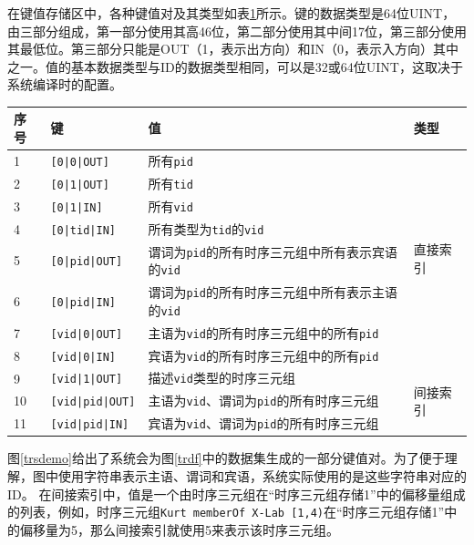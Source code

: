 在键值存储区中，各种键值对及其类型如表\ref{tab:trdf}所示。键的数据类型是64位UINT，由三部分组成，第一部分使用其高46位，第二部分使用其中间17位，第三部分使用其最低位。第三部分只能是OUT（1，表示出方向）和IN（0，表示入方向）其中之一。值的基本数据类型与ID的数据类型相同，可以是32或64位UINT，这取决于系统编译时的配置。
\begin{table}[!hpt]
  \label{tab:trdf}
  \centering
  \begin{tabular}{p{1cm}p{3cm}p{8cm}p{2cm}} \toprule
    序号 & 键 & 值 & 类型 \\ \midrule
    1\centering & \texttt{[0|0|OUT]} & 所有\texttt{pid} & \multirow{8}{*}{直接索引} \\
    2\centering & \texttt{[0|1|OUT]} & 所有\texttt{tid} & \\
    3\centering & \texttt{[0|1|IN]} & 所有\texttt{vid} & \\
    4\centering & \texttt{[0|tid|IN]} & 所有类型为\texttt{tid}的\texttt{vid} & \\
    5\centering & \texttt{[0|pid|OUT]} & 谓词为\texttt{pid}的所有时序三元组中所有表示宾语的\texttt{vid} & \\
    6\centering & \texttt{[0|pid|IN]} & 谓词为\texttt{pid}的所有时序三元组中所有表示主语的\texttt{vid} & \\
    7\centering & \texttt{[vid|0|OUT]} & 主语为\texttt{vid}的所有时序三元组中的所有\texttt{pid} & \\
    8\centering & \texttt{[vid|0|IN]} & 宾语为\texttt{vid}的所有时序三元组中的所有\texttt{pid} & \\ 
    \hline
    9\centering & \texttt{[vid|1|OUT]} & 描述\texttt{vid}类型的时序三元组 & \multirow{3}{*}{间接索引} \\ 
    10\centering & \texttt{[vid|pid|OUT]} & 主语为\texttt{vid}、谓词为\texttt{pid}的所有时序三元组 & \\ 
    11\centering & \texttt{[vid|pid|IN]} & 宾语为\texttt{vid}、谓词为\texttt{pid}的所有时序三元组 & \\ 
    \bottomrule
  \end{tabular}
\end{table}

图\ref{trsdemo}给出了系统会为图\ref{trdf}中的数据集生成的一部分键值对。为了便于理解，图中使用字符串表示主语、谓词和宾语，系统实际使用的是这些字符串对应的ID。
在间接索引中，值是一个由时序三元组在“时序三元组存储1”中的偏移量组成的列表，例如，时序三元组\texttt{Kurt memberOf X-Lab [1,4)}在“时序三元组存储1”中的偏移量为5，那么间接索引就使用5来表示该时序三元组。

